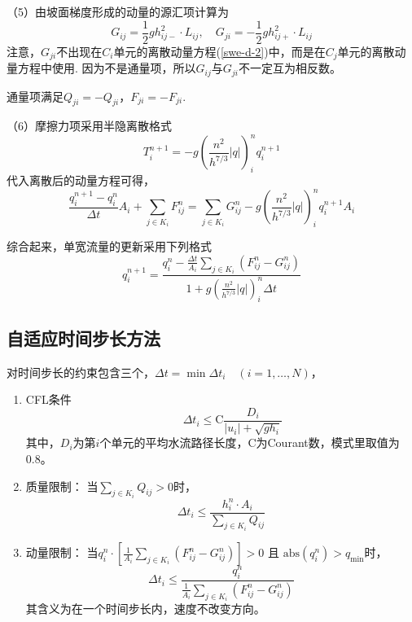 （5）由坡面梯度形成的动量的源汇项计算为~\citep{audusse2004scientificcomputing}
\begin{equation}
  G_{ij} = \frac{1}{2}gh_{ij-}^2 \cdot L_{ij}, \quad
  G_{ji}=-\frac{1}{2}g h_{ij+}^2 \cdot L_{ij}
\end{equation}
注意，$G_{ji}$不出现在$C_i$单元的离散动量方程(\ref{swe-d-2})中，而是在$C_j$单元的离散动量方程中使用. 因为不是通量项，所以$G_{ij}$与$G_{ji}$不一定互为相反数。

通量项满足$Q_{ji} = -Q_{ji}$，$F_{ji}=-F_{ji}$.

（6）摩擦力项采用半隐离散格式
\begin{equation}
  T^{n+1}_i = -g \left(\frac{n^2}{h^{7/3}} \left|q\right|\right)^n_i q^{n+1}_i
\end{equation}
代入离散后的动量方程可得，
\begin{equation}
  \frac{ q^{n+1}_i - q^n_i}{\Delta t} A_i + \sum_{j\in K_i} F^n_{ij} = \sum_{j\in K_i} G^n_{ij}  -g \left(\frac{n^2}{h^{7/3}} \left|q\right|\right)^n_i q^{n+1}_i  A_i
\end{equation}

综合起来，单宽流量的更新采用下列格式
\begin{equation}
  q^{n+1}_i = \frac{q^n_i - \frac{\Delta t}{A_i}\sum_{j\in K_i} \left(F^n_{ij} - G^n_{ij}\right)}{1 + g \left(\frac{n^2}{h^{7/3}} \left|q\right|\right)^n_i \Delta t}
\end{equation}

\subsection{自适应时间步长方法}
对时间步长的约束包含三个，$\Delta t = \min \Delta t_i \quad (i=1, \ldots, N)$，
\begin{enumerate}
  \item CFL条件
    \begin{equation}
      \qquad \Delta t_i \leqslant \mathrm{C}\frac{ D_i }{\left| u_{i}\right| + \sqrt{gh_{i}}}
    \end{equation}
    其中，$D_i$为第$i$个单元的平均水流路径长度，C为Courant数，模式里取值为0.8。
  \item 质量限制：
    当$\sum_{j\in K_i} Q_{ij}>0$时，
    \begin{equation}
      \Delta t_i \leqslant \frac{h^n_i\cdot A_i}{\sum_{j\in K_i} Q_{ij}}
    \end{equation}
  \item 动量限制：
    当$q^n_i \cdot \left[ \frac{1}{A_i}\sum_{j\in K_i} \left(F^n_{ij} - G^n_{ij} \right)\right] > 0$ 且 $\mathrm{abs}\left(q^n_i\right) > q_{\mathrm{min}}$时，
    \begin{equation}
      \Delta t_i \leqslant \frac{q^n_i}{\frac{1}{A_i}\sum_{j\in K_i} \left(F^n_{ij} - G^n_{ij} \right)}
    \end{equation}
    其含义为在一个时间步长内，速度不改变方向。
\end{enumerate}

